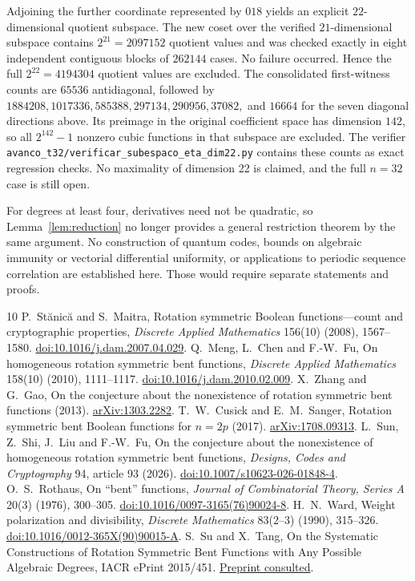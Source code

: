 \documentclass[11pt,a4paper]{article}
\begin{document}
Adjoining the further coordinate represented by $018$ yields an explicit $22$-dimensional quotient subspace. The new coset over the verified $21$-dimensional subspace contains $2^{21}=2097152$ quotient values and was checked exactly in eight independent contiguous blocks of $262144$ cases. No failure occurred. Hence the full $2^{22}=4194304$ quotient values are excluded. The consolidated first-witness counts are $65536$ antidiagonal, followed by $1884208, 1017336, 585388, 297134, 290956, 37082,$ and $16664$ for the seven diagonal directions above. Its preimage in the original coefficient space has dimension $142$, so all $2^{142}-1$ nonzero cubic functions in that subspace are excluded. The verifier \texttt{avanco\_t32/verificar\_subespaco\_eta\_dim22.py} contains these counts as exact regression checks. No maximality of dimension 22 is claimed, and the full $n=32$ case is still open.

For degrees at least four, derivatives need not be quadratic, so Lemma~\ref{lem:reduction} no longer provides a general restriction theorem by the same argument. No construction of quantum codes, bounds on algebraic immunity or vectorial differential uniformity, or applications to periodic sequence correlation are established here. Those would require separate statements and proofs.

\begin{thebibliography}{10}
 P.~St\u{a}nic\u{a} and S.~Maitra, Rotation symmetric Boolean functions---count and cryptographic properties, \emph{Discrete Applied Mathematics} 156(10) (2008), 1567--1580. \href{https://doi.org/10.1016/j.dam.2007.04.029}{doi:10.1016/j.dam.2007.04.029}.
 Q.~Meng, L.~Chen and F.-W.~Fu, On homogeneous rotation symmetric bent functions, \emph{Discrete Applied Mathematics} 158(10) (2010), 1111--1117. \href{https://doi.org/10.1016/j.dam.2010.02.009}{doi:10.1016/j.dam.2010.02.009}.
 X.~Zhang and G.~Gao, On the conjecture about the nonexistence of rotation symmetric bent functions (2013). \href{https://arxiv.org/abs/1303.2282}{arXiv:1303.2282}.
 T.~W.~Cusick and E.~M.~Sanger, Rotation symmetric bent Boolean functions for $n=2p$ (2017). \href{https://arxiv.org/abs/1708.09313}{arXiv:1708.09313}.
 L.~Sun, Z.~Shi, J.~Liu and F.-W.~Fu, On the conjecture about the nonexistence of homogeneous rotation symmetric bent functions, \emph{Designs, Codes and Cryptography} 94, article 93 (2026). \href{https://doi.org/10.1007/s10623-026-01848-4}{doi:10.1007/s10623-026-01848-4}.
 O.~S.~Rothaus, On ``bent'' functions, \emph{Journal of Combinatorial Theory, Series A} 20(3) (1976), 300--305. \href{https://doi.org/10.1016/0097-3165(76)90024-8}{doi:10.1016/0097-3165(76)90024-8}.
 H.~N.~Ward, Weight polarization and divisibility, \emph{Discrete Mathematics} 83(2--3) (1990), 315--326. \href{https://doi.org/10.1016/0012-365X(90)90015-A}{doi:10.1016/0012-365X(90)90015-A}.
 S.~Su and X.~Tang, On the Systematic Constructions of Rotation Symmetric Bent Functions with Any Possible Algebraic Degrees, IACR ePrint 2015/451. \href{https://eprint.iacr.org/2015/451.pdf}{Preprint consulted}.
\end{thebibliography}
\end{document}
